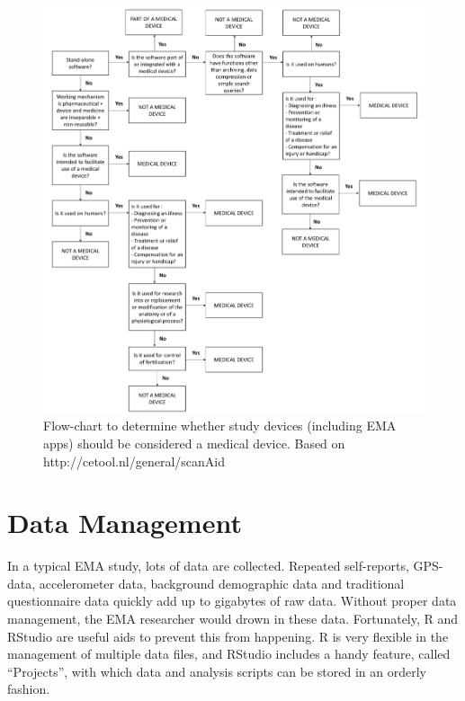 \documentclass[]{book}
\begin{document}
\begin{figure}

{\centering \includegraphics[width=0.9\linewidth]{images/outcomes/Medical_deviceFC} 

}

\caption{Flow-chart to determine whether study devices (including EMA apps) should be considered a medical device. Based on http://cetool.nl/general/scanAid}\label{fig:fig3b}
\end{figure}

\chapter{Data Management}\label{datamanagement}


In a typical EMA study, lots of data are collected. Repeated
self-reports, GPS-data, accelerometer data, background demographic data
and traditional questionnaire data quickly add up to gigabytes of raw
data. Without proper data management, the EMA researcher would drown in
these data. Fortunately, R and RStudio are useful aids to prevent this
from happening. R is very flexible in the management of multiple data
files, and RStudio includes a handy feature, called ``Projects'', with
which data and analysis scripts can be stored in an orderly fashion.
\end{document}
